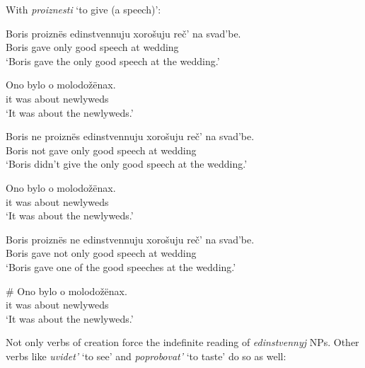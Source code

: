 With \textit{proiznesti} `to give (a speech)':

\begin{exe}
	\ex \begin{xlist}
		\ex \gll Boris proizn\"{e}s edinstvennuju xoro\v{s}uju re\v{c}' na svad'be.\\
		Boris gave only good speech at wedding\\
		\glt `Boris gave the only good speech at the wedding.'

		\ex \gll Ono bylo o molodo\v{z}\"{e}nax.\\
		it was about newlyweds\\
		\glt `It was about the newlyweds.'
	\end{xlist}

	\ex \begin{xlist}
		\ex \gll Boris ne proizn\"{e}s edinstvennuju xoro\v{s}uju re\v{c}' na svad'be.\\
		Boris not gave only good speech at wedding\\
		\glt `Boris didn't give the only good speech at the wedding.'

		\ex \gll Ono bylo o molodo\v{z}\"{e}nax.\\
		it was about newlyweds\\
		\glt `It was about the newlyweds.'
	\end{xlist}

	\ex \label{boris3} \begin{xlist}
		\ex \gll Boris proizn\"{e}s ne edinstvennuju xoro\v{s}uju re\v{c}' na svad'be.\\
		Boris gave not only good speech at wedding\\
		\glt `Boris gave one of the good speeches at the wedding.'

		\ex \gll \# Ono bylo o molodo\v{z}\"{e}nax.\\
		{} it was about newlyweds\\
		\glt `It was about the newlyweds.'
	\end{xlist}
\end{exe}

Not only verbs of creation force the indefinite reading of \textit{edinstvennyj} NPs. Other verbs like \textit{uvidet'} `to see' and \textit{poprobovat'} `to taste' do so as well:

